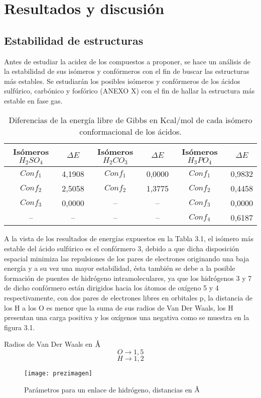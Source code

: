 \chapter{Resultados y discusión}

\section{Estabilidad de estructuras}

Antes de estudiar la acidez de los compuestos a proponer, se hace un análisis de la estabilidad de sus isómeros y confórmeros con el fin de buscar las estructuras más estables. 
Se estudiarán los posibles isómeros y confórmeros de los ácidos sulfúrico, carbónico y fosfórico (ANEXO X) con el fin de hallar la estructura más estable en fase gas. \\

  \begin{table}[H]
\begin{center}
\begin{tabular}{|c|c|c|c|c|c|}
\hline
Isómeros $H_2SO_4$ & $\Delta E$ & Isómeros $H_2CO_3$ & $\Delta E$ & Isómeros $H_3PO_4$ & $\Delta E$ \\ \hline
$Conf_1$ & 4,1908 & $Conf_1$ & 0,0000 & $Conf_1$ & 0,9832 \\ \hline
$Conf_2$ & 2,5058 & $Conf_2$ & 1,3775 & $Conf_2$ & 0,4458 \\ \hline
$Conf_3$ & 0,0000 & -- & -- & $Conf_3$ & 0,0000 \\ \hline
-- & -- & -- & -- & $Conf_4$ & 0,6187 \\ \hline
\end{tabular}
\caption{Diferencias de la energía libre de Gibbs en Kcal/mol de cada isómero conformacional de los ácidos.}
\label{tab:3.1}
\end{center}
\end{table}
A la vista de los resultados de energías expuestos en la Tabla 3.1, el isómero más estable del ácido sulfúrico es el confórmero 3, debido a que dicha disposición espacial minimiza las repulsiones de los pares de electrones originando una baja energía y a su vez una mayor estabilidad, ésta también se debe a la posible formación de puentes de hidrógeno intramoleculares, ya que los hidrógenos 3 y 7 de dicho confórmero están dirigidos hacia los átomos de oxígeno 5 y 4 respectivamente, con dos pares de electrones libres en orbitales p, la distancia de los H a los O es menor que la suma de sus radios de Van Der Waals, los H presentan una carga positiva y los oxígenos una negativa como se muestra en la figura 3.1. \\
\begin{center} Radios de Van Der Waals en $\mbox{\normalfont\AA} $
$$O\longrightarrow1,5$$
$$H\longrightarrow1,2
$$
\end{center}
\begin{figure}[H]
	\centering
	\texttt{[image: prezimagen]}
	\caption{Parámetros para un enlace de hidrógeno, distancias en $\mbox{\normalfont\AA}$}
\end{figure}

